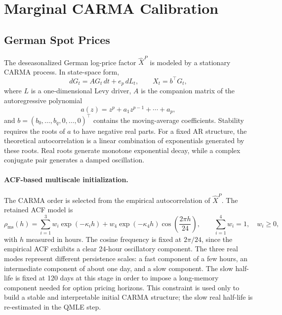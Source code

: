 \section{Marginal CARMA Calibration}\label{sec:marginal-carma-calibration}

\subsection{German Spot Prices}\label{ssec:german-price-carma-calibration}

The deseasonalized German log-price factor \(\widehat X^P\) is modeled by a
stationary CARMA process. In state-space form,
\begin{equation}
  dG_t = A G_t\,dt + e_p\,dL_t,
  \qquad
  X_t = b^\top G_t ,
  \label{eq:price-carma-state-space}
\end{equation}
where \(L\) is a one-dimensional Levy driver, \(A\) is the companion matrix of
the autoregressive polynomial
\begin{equation}
  a(z)=z^p+a_1z^{p-1}+\cdots+a_p,
  \label{eq:price-ar-polynomial}
\end{equation}
and \(b=(b_0,\ldots,b_q,0,\ldots,0)^\top\) contains the moving-average
coefficients. Stability requires the roots of \(a\) to have negative real
parts. For a fixed AR structure, the theoretical autocorrelation is a linear
combination of exponentials generated by these roots. Real roots generate
monotone exponential decay, while a complex conjugate pair generates a damped
oscillation.

\paragraph{ACF-based multiscale initialization.}
The CARMA order is selected from the empirical autocorrelation of
\(\widehat X^P\). The retained ACF model is
\begin{equation}
  \rho_{\mathrm{ms}}(h)
  =
  \sum_{i=1}^{3} w_i \exp(-\kappa_i h)
  +
  w_4 \exp(-\kappa_4 h)
  \cos\left(\frac{2\pi h}{24}\right),
  \qquad
  \sum_{i=1}^{4}w_i=1,\quad w_i\ge 0,
  \label{eq:price-multiscale-acf}
\end{equation}
with \(h\) measured in hours. The cosine frequency is fixed at
\(2\pi/24\), since the empirical ACF exhibits a clear 24-hour oscillatory
component. The three real modes represent different persistence scales: a fast
component of a few hours, an intermediate component of about one day, and a
slow component. The slow half-life is fixed at 120 days at this stage in order
to impose a long-memory component needed for option pricing horizons. This
constraint is used only to build a stable and interpretable initial CARMA
structure; the slow real half-life is re-estimated in the QMLE step.

